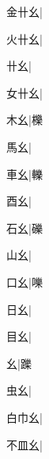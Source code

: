 \begin{multicols}{2}
{{\cjk{}金卄幺}|{}\par
{\cjk{}火卄幺}|{}\par
{卄幺}|{}\par
{\cjk{}女卄幺}|{}\par
{\cjk{}{\cnsym{}　}木幺}|{\cjk{}櫟}\par
{\cjk{}{\cnsym{}　}馬幺}|{}\par
{\cjk{}{\cnsym{}　}車幺}|{\cjk{}轢}\par
{\cjk{}{\cnsym{}　}酉幺}|{}\par
{\cjk{}{\cnsym{}　}石幺}|{\cjk{}礫}\par
{\cjk{}{\cnsym{}　}山幺}|{}\par
{\cjk{}{\cnsym{}　}口幺}|{\cjk{}嚛}\par
{\cjk{}{\cnsym{}　}日幺}|{}\par
{\cjk{}{\cnsym{}　}目幺}|{}\par
{幺}|{\cjk{}躒}\par
{\cjk{}{\cnsym{}　}虫幺}|{}\par
{\cjk{}白巾幺}|{}\par
{\cjk{}不皿幺}|{}\par
}
\end{multicols}
